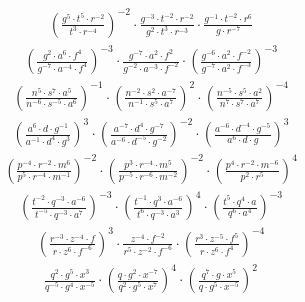 \begin{align}
\left(\frac{g^{5}\cdot t^{5}\cdot r^{-2}}{t^{3}\cdot r^{-4}}\right)^{-2}\cdot \frac{g^{-3}\cdot t^{-2}\cdot r^{-2}}{g^{2}\cdot t^{3}\cdot r^{-3}}\cdot \frac{g^{-1}\cdot t^{-2}\cdot r^{6}}{g\cdot r^{-7}}
\end{align}
\begin{align}
\left(\frac{g^{2}\cdot a^{6}\cdot f^{4}}{g^{-7}\cdot a^{-4}\cdot f^{4}}\right)^{-3}\cdot \frac{g^{-7}\cdot a^{2}\cdot f^{2}}{g^{-2}\cdot a^{-3}\cdot f^{-2}}\cdot \left(\frac{g^{-6}\cdot a^{2}\cdot f^{-2}}{g^{-7}\cdot a^{2}\cdot f^{-3}}\right)^{-3}
\end{align}
\begin{align}
\left(\frac{n^{5}\cdot s^{7}\cdot a^{5}}{n^{-6}\cdot s^{-5}\cdot a^{6}}\right)^{-1}\cdot \left(\frac{n^{-2}\cdot s^{2}\cdot a^{-7}}{n^{-1}\cdot s^{5}\cdot a^{7}}\right)^{2}\cdot \left(\frac{n^{-5}\cdot s^{5}\cdot a^{2}}{n^{7}\cdot s^{7}\cdot a^{7}}\right)^{-4}
\end{align}
\begin{align}
\left(\frac{a^{6}\cdot d\cdot g^{-1}}{a^{-1}\cdot d^{4}\cdot g^{3}}\right)^{3}\cdot \left(\frac{a^{-7}\cdot d^{4}\cdot g^{-7}}{a^{-6}\cdot d^{-5}\cdot g^{-2}}\right)^{-2}\cdot \left(\frac{a^{-6}\cdot d^{-4}\cdot g^{-5}}{a^{6}\cdot d\cdot g}\right)^{3}
\end{align}
\begin{align}
\left(\frac{p^{-4}\cdot r^{-2}\cdot m^{6}}{p^{5}\cdot r^{-4}\cdot m^{-1}}\right)^{-2}\cdot \left(\frac{p^{3}\cdot r^{-4}\cdot m^{5}}{p^{-5}\cdot r^{-6}\cdot m^{-2}}\right)^{-2}\cdot \left(\frac{p^{4}\cdot r^{-2}\cdot m^{-6}}{p^{2}\cdot r^{5}}\right)^{4}
\end{align}
\begin{align}
\left(\frac{t^{-2}\cdot q^{-3}\cdot a^{-6}}{t^{-5}\cdot q^{-3}\cdot a^{7}}\right)^{-3}\cdot \left(\frac{t^{-1}\cdot q^{3}\cdot a^{-6}}{t^{6}\cdot q^{-3}\cdot a^{3}}\right)^{4}\cdot \left(\frac{t^{5}\cdot q^{4}\cdot a}{q^{6}\cdot a^{4}}\right)^{-3}
\end{align}
\begin{align}
\left(\frac{r^{-3}\cdot z^{-4}\cdot f}{r\cdot z^{6}\cdot f^{-6}}\right)^{3}\cdot \frac{z^{-4}\cdot f^{-2}}{r^{5}\cdot z^{-2}\cdot f^{-6}}\cdot \left(\frac{r^{3}\cdot z^{-5}\cdot f^{5}}{r\cdot z^{6}\cdot f^{4}}\right)^{-4}
\end{align}
\begin{align}
\frac{q^{2}\cdot g^{5}\cdot x^{3}}{q^{-5}\cdot g^{4}\cdot x^{-5}}\cdot \left(\frac{q\cdot g^{2}\cdot x^{-7}}{q^{2}\cdot g^{5}\cdot x^{7}}\right)^{4}\cdot \left(\frac{q^{7}\cdot g\cdot x^{5}}{q\cdot g^{5}\cdot x^{-5}}\right)^{2}
\end{align}
